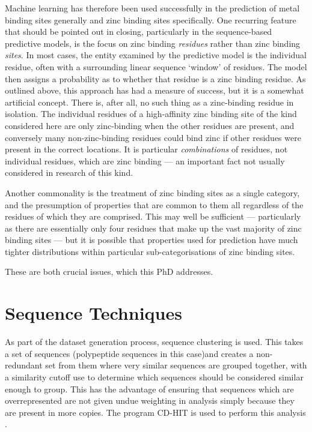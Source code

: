Machine learning has therefore been used successfully in the prediction of metal binding sites generally and zinc binding sites specifically. One recurring feature that should be pointed out in closing, particularly in the sequence-based
predictive models, is the focus on zinc binding \emph{residues} rather
than zinc binding \emph{sites}. In most cases, the entity examined by the predictive model
is the individual residue, often with a surrounding linear sequence `window'
of residues. The model then assigns a probability as to whether that
residue is a zinc binding residue. As outlined above, this approach has 
had a measure of success, but it is a somewhat artificial
concept. There is, after all, no such thing as a zinc-binding residue
in isolation. The individual residues of a high-affinity zinc binding
site of the kind considered here are only zinc-binding when the other
residues are present, and conversely many non-zinc-binding residues
could bind zinc if other residues were present in the correct
locations. It is particular \emph{combinations} of residues, not individual
residues, which are zinc binding --- an important fact not usually
considered in research of this kind.

Another commonality is the treatment of zinc binding sites as a single
category, and the presumption of properties that are common to them
all regardless of the residues of which they are comprised. This may
well be sufficient --- particularly as there are essentially only four
residues that make up the vast majority of zinc binding sites --- but
it is possible that properties used for prediction have much tighter
distributions within particular sub-categorisations of zinc binding
sites.

These are both crucial issues, which this PhD addresses.

\section{Sequence Techniques}

As part of the dataset generation process, sequence clustering is used. This takes a set of sequences (polypeptide sequences in this case)and creates a non-redundant set from them where very similar sequences are grouped together, with a similarity cutoff use to determine which sequences should be considered similar enough to group. This has the advantage of ensuring that sequences which are overrepresented are not given undue weighting in analysis simply because they are present in more copies. The program CD-HIT is used to perform this analysis \cite{li2006cdhit}.

